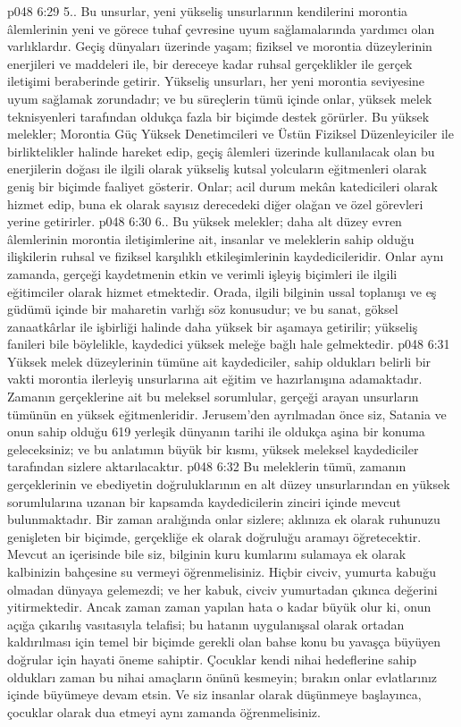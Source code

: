 \vs p048 6:29 5.\bibnobreakspace {}. Bu unsurlar, yeni yükseliş unsurlarının kendilerini morontia âlemlerinin yeni ve görece tuhaf çevresine uyum sağlamalarında yardımcı olan varlıklardır. Geçiş dünyaları üzerinde yaşam; fiziksel ve morontia düzeylerinin enerjileri ve maddeleri ile, bir dereceye kadar ruhsal gerçeklikler ile gerçek iletişimi beraberinde getirir. Yükseliş unsurları, her yeni morontia seviyesine uyum sağlamak zorundadır; ve bu süreçlerin tümü içinde onlar, yüksek melek teknisyenleri tarafından oldukça fazla bir biçimde destek görürler. Bu yüksek melekler; Morontia Güç Yüksek Denetimcileri ve Üstün Fiziksel Düzenleyiciler ile birliktelikler halinde hareket edip, geçiş âlemleri üzerinde kullanılacak olan bu enerjilerin doğası ile ilgili olarak yükseliş kutsal yolcuların eğitmenleri olarak geniş bir biçimde faaliyet gösterir. Onlar; acil durum mekân katedicileri olarak hizmet edip, buna ek olarak sayısız derecedeki diğer olağan ve özel görevleri yerine getirirler.
\vs p048 6:30 6.\bibnobreakspace {}. Bu yüksek melekler; daha alt düzey evren âlemlerinin morontia iletişimlerine ait, insanlar ve meleklerin sahip olduğu ilişkilerin ruhsal ve fiziksel karşılıklı etkileşimlerinin kaydedicileridir. Onlar aynı zamanda, gerçeği kaydetmenin etkin ve verimli işleyiş biçimleri ile ilgili eğitimciler olarak hizmet etmektedir. Orada, ilgili bilginin ussal toplanışı ve eş güdümü içinde bir maharetin varlığı söz konusudur; ve bu sanat, göksel zanaatkârlar ile işbirliği halinde daha yüksek bir aşamaya getirilir; yükseliş fanileri bile böylelikle, kaydedici yüksek meleğe bağlı hale gelmektedir.
\vs p048 6:31 Yüksek melek düzeylerinin tümüne ait kaydediciler, sahip oldukları belirli bir vakti morontia ilerleyiş unsurlarına ait eğitim ve hazırlanışına adamaktadır. Zamanın gerçeklerine ait bu meleksel sorumlular, gerçeği arayan unsurların tümünün en yüksek eğitmenleridir. Jerusem’den ayrılmadan önce siz, Satania ve onun sahip olduğu 619 yerleşik dünyanın tarihi ile oldukça aşina bir konuma geleceksiniz; ve bu anlatımın büyük bir kısmı, yüksek meleksel kaydediciler tarafından sizlere aktarılacaktır.
\vs p048 6:32 Bu meleklerin tümü, zamanın gerçeklerinin ve ebediyetin doğruluklarının en alt düzey unsurlarından en yüksek sorumlularına uzanan bir kapsamda kaydedicilerin zinciri içinde mevcut bulunmaktadır. Bir zaman aralığında onlar sizlere; aklınıza ek olarak ruhunuzu genişleten bir biçimde, gerçekliğe ek olarak doğruluğu aramayı öğretecektir. Mevcut an içerisinde bile siz, bilginin kuru kumlarını sulamaya ek olarak kalbinizin bahçesine su vermeyi öğrenmelisiniz. Hiçbir civciv, yumurta kabuğu olmadan dünyaya gelemezdi; ve her kabuk, civciv yumurtadan çıkınca değerini yitirmektedir. Ancak zaman zaman yapılan hata o kadar büyük olur ki, onun açığa çıkarılış vasıtasıyla telafisi; bu hatanın uygulanışsal olarak ortadan kaldırılması için temel bir biçimde gerekli olan bahse konu bu yavaşça büyüyen doğrular için hayati öneme sahiptir. Çocuklar kendi nihai hedeflerine sahip oldukları zaman bu nihai amaçların önünü kesmeyin; bırakın onlar evlatlarınız içinde büyümeye devam etsin. Ve siz insanlar olarak düşünmeye başlayınca, çocuklar olarak dua etmeyi aynı zamanda öğrenmelisiniz.
